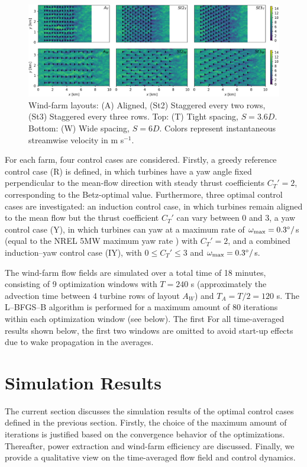 \documentclass[a4paper]{jpconf}
\begin{document}
\begin{figure}
	\includegraphics[width=\textwidth]{Torque18/eps/drawing.eps}
	\caption{Wind-farm layouts: (A) Aligned, (St2) Staggered every two rows, (St3) Staggered every three rows. Top: (T) Tight spacing, $S= 3.6D$. Bottom: (W) Wide spacing, $S = 6D$. Colors represent instantaneous streamwise velocity in m s$^{-1}$.\label{fig:wf_layouts}}
\end{figure}


For each farm, four control cases are considered. Firstly, a greedy reference control case (R) is defined, in which turbines have a yaw angle fixed perpendicular to
the mean-flow direction with steady thrust coefficients $C_T' = 2$, corresponding to the Betz-optimal value. Furthermore, three optimal control cases
are investigated: an induction control case, in which turbines remain aligned to the mean flow but the thrust coefficient $C_T'$ can vary between 0
and 3, a yaw control case (Y), in which turbines can yaw at a maximum rate of $\omega_{\rm max} = 0.3^\circ /$s (equal to the NREL 5MW maximum yaw
rate ) with $C_T' = 2$, and a combined induction--yaw control case (IY), with $0 \leq C_T' \leq 3$ and $\omega_{\rm max} = 0.3^\circ/$s. 

The wind-farm flow fields are simulated over a total time of 18 minutes, consisting of 9 optimization windows with $T = 240$ s (approximately the advection time between 4 turbine rows of layout $A_W$) and $T_A = T/2 = 120$ s.
The {L--BFGS--B} algorithm is performed for a maximum amount of 80 iterations within each optimization window (see below). The first 
For all time-averaged results shown below, the first two windows are omitted to avoid start-up effects due to wake propagation in the averages.

\section{Simulation Results}\label{sec:results}
The current section discusses the simulation results of the optimal control cases defined in the previous section. Firstly, the choice of the maximum
amount of iterations is justified based on the convergence behavior of the optimizations. Thereafter, power extraction and wind-farm efficiency are
discussed. Finally, we provide a qualitative view on the time-averaged flow field and control dynamics. 
\end{document}
